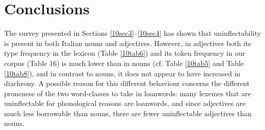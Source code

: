 \documentclass[output=paper,colorlinks,citecolor=brown]{langscibook}
\begin{document}
\section{Conclusions} \label{10sec5}

The survey presented in Sections \ref{10sec3}--\ref{10sec4} has shown that uninflectability is present in both Italian nouns and adjectives. However, in adjectives both its type frequency in the lexicon (Table \ref{10tab6}) and its token frequency in our corpus (Table 16) is much lower than in nouns (cf. Table \ref{10tab5} and Table \ref{10tab8}), and in contrast to nouns, it does not appear to have increased in diachrony. A possible reason for this different behaviour concerns the different proneness of the two word-classes to take in loanwords: many lexemes that are uninflectable for phonological reasons are loanwords, and since adjectives are much less borrowable than nouns, there are fewer uninflectable adjectives than nouns.
\end{document}
